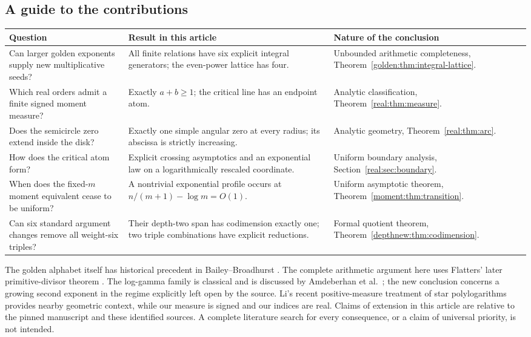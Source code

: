 \documentclass[11pt,letterpaper]{article}
\theoremstyle{definition}
\theoremstyle{remark}
\numberwithin{equation}{section}
\begin{document}
\subsection{A guide to the contributions}
\begin{center}
\small
\renewcommand{\arraystretch}{1.16}
\begin{tabular}{@{}>{\raggedright\arraybackslash}p{}>{\raggedright\arraybackslash}p{}>{\raggedright\arraybackslash}p{}@{}}
\toprule
Question & Result in this article & Nature of the conclusion\\
\midrule
Can larger golden exponents supply new multiplicative seeds?
& All finite relations have six explicit integral generators;
the even-power lattice has four.
& Unbounded arithmetic completeness,
Theorem~\ref{golden:thm:integral-lattice}.\\
Which real orders admit a finite signed moment measure?
& Exactly \(a+b\ge1\); the critical line has an endpoint atom.
& Analytic classification,
Theorem~\ref{real:thm:measure}.\\
Does the semicircle zero extend inside the disk?
& Exactly one simple angular zero at every radius;
its abscissa is strictly increasing.
& Analytic geometry,
Theorem~\ref{real:thm:arc}.\\
How does the critical atom form?
& Explicit crossing asymptotics and an exponential law on a
logarithmically rescaled coordinate.
& Uniform boundary analysis,
Section~\ref{real:sec:boundary}.\\
When does the fixed-\(m\) moment equivalent cease to be uniform?
& A nontrivial exponential profile occurs at
\(n/(m+1)-\log m=O(1)\).
& Uniform asymptotic theorem,
Theorem~\ref{moment:thm:transition}.\\
Can six standard argument changes remove all weight-six triples?
& Their depth-two span has codimension exactly one; two triple
combinations have explicit reductions.
& Formal quotient theorem,
Theorem~\ref{depthnew:thm:codimension}.\\
\bottomrule
\end{tabular}
\end{center}

The golden alphabet itself has historical precedent in
Bailey--Broadhurst \cite{BaileyBroadhurst1999}. The complete arithmetic
argument here uses Flatters' later primitive-divisor theorem
\cite{Flatters2009}. The log-gamma family is classical and is discussed
by Amdeberhan et al.\ \cite{Amdeberhan2011}; the new conclusion concerns
a growing second exponent in the regime explicitly left open by the
source. Li's recent positive-measure treatment of star polylogarithms
\cite{Li2026} provides nearby geometric context, while our measure is
signed and our indices are real.
Claims of extension in this article are relative to the pinned
manuscript and these identified sources. A complete literature search
for every consequence, or a claim of universal priority, is not intended.
\end{document}
